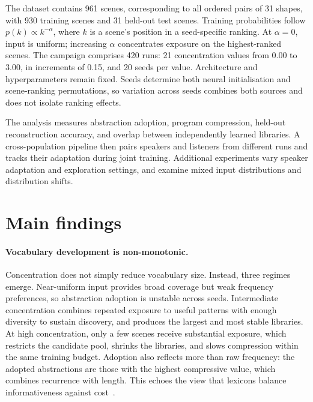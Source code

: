 \documentclass[%
    12pt, %
    oneside, %
    a4paper, %
    notitlepage, %
]{article}
\begin{document}
The dataset contains 961 scenes, corresponding to all ordered pairs of 31 shapes, with 930 training scenes and 31 held-out test scenes. Training probabilities follow $p(k)\propto k^{-\alpha}$, where $k$ is a scene's position in a seed-specific ranking. At $\alpha=0$, input is uniform; increasing $\alpha$ concentrates exposure on the highest-ranked scenes. The campaign comprises 420 runs: 21 concentration values from 0.00 to 3.00, in increments of 0.15, and 20 seeds per value. Architecture and hyperparameters remain fixed. Seeds determine both neural initialisation and scene-ranking permutations, so variation across seeds combines both sources and does not isolate ranking effects.

The analysis measures abstraction adoption, program compression, held-out reconstruction accuracy, and overlap between independently learned libraries. A cross-population pipeline then pairs speakers and listeners from different runs and tracks their adaptation during joint training. Additional experiments vary speaker adaptation and exploration settings, and examine mixed input distributions and distribution shifts.

\section*{Main findings}

\paragraph{Vocabulary development is non-monotonic.}
Concentration does not simply reduce vocabulary size. Instead, three regimes emerge. Near-uniform input provides broad coverage but weak frequency preferences, so abstraction adoption is unstable across seeds. Intermediate concentration combines repeated exposure to useful patterns with enough diversity to sustain discovery, and produces the largest and most stable libraries. At high concentration, only a few scenes receive substantial exposure, which restricts the candidate pool, shrinks the libraries, and slows compression within the same training budget. Adoption also reflects more than raw frequency: the adopted abstractions are those with the highest compressive value, which combines recurrence with length. This echoes the view that lexicons balance informativeness against cost~\cite{gibson_how_2019}.
\end{document}

